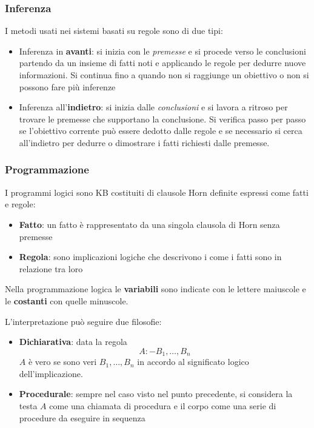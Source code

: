 \subsubsection{Inferenza}
I metodi usati nei sistemi basati su regole sono di due tipi:
\begin{itemize}
	\item Inferenza in \textbf{avanti}: si inizia con le \textit{premesse} e si procede verso le conclusioni partendo da un insieme di fatti noti e applicando le regole per dedurre nuove informazioni. Si continua fino a quando non si raggiunge un obiettivo o non si possono fare più inferenze
	\item Inferenza all'\textbf{indietro}: si inizia dalle \textit{conclusioni} e si lavora a ritroso per trovare le premesse che supportano la conclusione. Si verifica passo per passo se l'obiettivo corrente può essere dedotto dalle regole e se necessario si cerca all'indietro per dedurre o dimostrare i fatti richiesti dalle premesse.
\end{itemize}

\subsubsection{Programmazione}
I programmi logici sono KB costituiti di clausole Horn definite espressi come fatti e regole:
\begin{itemize}
	\item \textbf{Fatto}: un fatto è rappresentato da una singola clausola di Horn senza premesse
	\item \textbf{Regola}: sono implicazioni logiche che descrivono i come i fatti sono in relazione tra loro
\end{itemize}

\begin{note}
	Nella programmazione logica le \textbf{variabili} sono indicate con le lettere maiuscole e le \textbf{costanti} con quelle minuscole.
\end{note}
L'interpretazione può seguire due filosofie:
\begin{itemize}
	\item \textbf{Dichiarativa}: data la regola
	\begin{equation*}
		A :- B_1, \ldots, B_n 
	\end{equation*}
	$A$ è vero se sono veri $B_1, \ldots, B_n$ in accordo al significato logico dell'implicazione.
	\item \textbf{Procedurale}: sempre nel caso visto nel punto precedente, si considera la testa $A$ come una chiamata di procedura e il corpo come una serie di procedure da eseguire in sequenza
\end{itemize}

